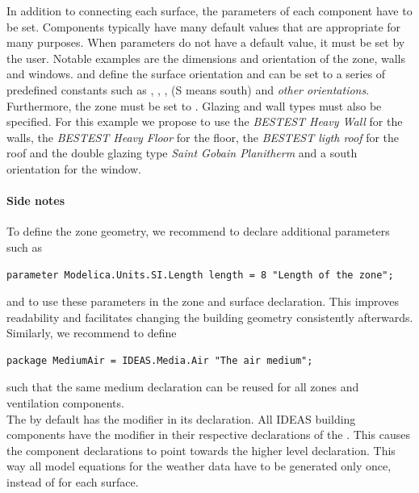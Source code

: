 \documentclass[10pt,a4paper]{article}
\begin{document}
In addition to connecting each surface, the parameters of each component have to be set. 
Components typically have many default values that are appropriate for many purposes.
When parameters do not have a default value, it must be set by the user. 
Notable examples are the dimensions and orientation of the zone, walls and windows. 
 and  define the surface orientation and can be set to a series of predefined constants such as , , ,  (S means south) and \textit{other orientations}.
Furthermore, the zone  must be set to .
Glazing and wall types must also be specified.
For this example we propose to use the \textit{BESTEST Heavy Wall} for the walls, the \textit{BESTEST Heavy Floor} for the floor, the \textit{BESTEST ligth roof} for the roof
and the double glazing type \textit{Saint Gobain Planitherm} and a south orientation for the window.

\paragraph{Side notes}
To define the zone geometry, 
we recommend to declare additional parameters such as
\begin{verbatim}
parameter Modelica.Units.SI.Length length = 8 "Length of the zone";
\end{verbatim}
and to use these parameters in the zone and surface declaration. 
This improves readability and facilitates changing the building geometry consistently afterwards.\\

Similarly, we recommend to define
\begin{verbatim}
package MediumAir = IDEAS.Media.Air "The air medium";
\end{verbatim}
such that the same medium declaration can be reused for all zones and ventilation components.\\

The  by default has the modifier  in its declaration. 
All IDEAS building components have the modifier  in their respective 
declarations of the . 
This causes the component declarations to point towards the higher level 
declaration. This way all model equations for the weather data have to be generated only once,
instead of for each surface.
\end{document}
